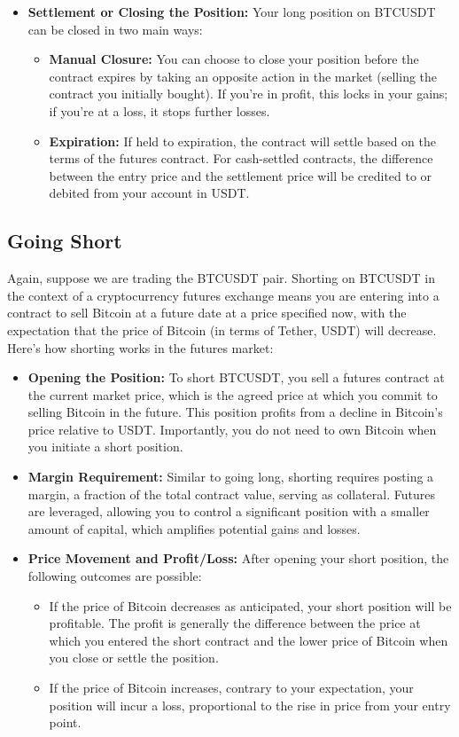 \documentclass{report}
\begin{document}
\begin{itemize}
        \item \textbf{Settlement or Closing the Position:} Your long position on BTCUSDT can be closed in two main ways:
            \begin{itemize}
                \item \textbf{Manual Closure:} You can choose to close your position before the contract expires by taking an opposite action in the market (selling the contract you initially bought). If you’re in profit, this locks in your gains; if you’re at a loss, it stops further losses.
                \item \textbf{Expiration:} If held to expiration, the contract will settle based on the terms of the futures contract. For cash-settled contracts, the difference between the entry price and the settlement price will be credited to or debited from your account in USDT.
            \end{itemize}
    \end{itemize}
    \bigbreak \noindent 
    \subsection{Going Short}
    Again, suppose we are trading the BTCUSDT pair. Shorting on BTCUSDT in the context of a cryptocurrency futures exchange means you are entering into a contract to sell Bitcoin at a future date at a price specified now, with the expectation that the price of Bitcoin (in terms of Tether, USDT) will decrease. Here’s how shorting works in the futures market:
    \begin{itemize}
        \item \textbf{Opening the Position:} To short BTCUSDT, you sell a futures contract at the current market price, which is the agreed price at which you commit to selling Bitcoin in the future. This position profits from a decline in Bitcoin's price relative to USDT. Importantly, you do not need to own Bitcoin when you initiate a short position.
        \item \textbf{Margin Requirement:} Similar to going long, shorting requires posting a margin, a fraction of the total contract value, serving as collateral. Futures are leveraged, allowing you to control a significant position with a smaller amount of capital, which amplifies potential gains and losses.
        \item \textbf{Price Movement and Profit/Loss:} After opening your short position, the following outcomes are possible:
            \begin{itemize}
                \item If the price of Bitcoin decreases as anticipated, your short position will be profitable. The profit is generally the difference between the price at which you entered the short contract and the lower price of Bitcoin when you close or settle the position.
                \item If the price of Bitcoin increases, contrary to your expectation, your position will incur a loss, proportional to the rise in price from your entry point.
            \end{itemize}
    \end{itemize}
\end{document}
